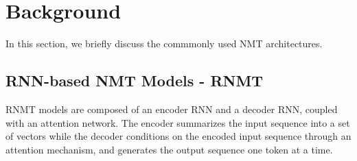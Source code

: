 \documentclass[11pt,a4paper]{article}
\begin{document}
\section{Background}
\label{sec:background}

In this section, we briefly discuss the commmonly used NMT architectures.


\subsection{RNN-based NMT Models - RNMT}
RNMT models are composed of an encoder RNN and a decoder RNN, coupled with an
attention network. The encoder summarizes the input sequence into a set of
vectors while the decoder conditions on the encoded input sequence through an
attention mechanism, and generates the output sequence one token at a time.



\end{document}
